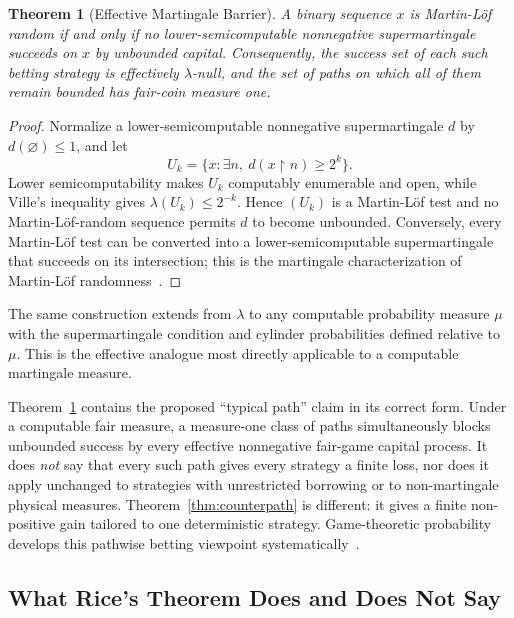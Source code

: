 \documentclass[aps,pra,reprint,superscriptaddress,amsmath,amssymb,floatfix]{revtex4-2}
\theoremstyle{plain}
\newtheorem{theorem}{Theorem}
\theoremstyle{definition}
\theoremstyle{remark}
\begin{document}
\begin{theorem}[Effective Martingale Barrier]
  \label{thm:effective}
  A binary sequence \(x\) is Martin-L\"of random if and only if no
  lower-semicomputable nonnegative supermartingale succeeds on \(x\) by
  unbounded capital. Consequently, the success set of each such betting
  strategy is effectively \(\lambda\)-null, and the set of paths on which all
  of them remain bounded has fair-coin measure one.
\end{theorem}

\begin{proof}
Normalize a lower-semicomputable nonnegative supermartingale \(d\) by
\(d(\varnothing)\leq1\), and let
\[
  U_k=\{x:\exists n,\ d(x{\upharpoonright}n)\geq2^k\}.
\]
Lower semicomputability makes \(U_k\) computably enumerable and open, while
Ville's inequality gives \(\lambda(U_k)\leq2^{-k}\). Hence
\((U_k)\) is a Martin-L\"of test and no Martin-L\"of-random sequence permits
\(d\) to become unbounded. Conversely, every Martin-L\"of test can be converted
into a lower-semicomputable supermartingale that succeeds on its intersection;
this is the martingale characterization of Martin-L\"of
randomness~\cite{calude:02,Nies2009}.
\end{proof}

The same construction extends from \(\lambda\) to any computable probability
measure \(\mu\) with the supermartingale condition and cylinder probabilities
defined relative to \(\mu\). This is the effective analogue most directly
applicable to a computable martingale measure.

Theorem~\ref{thm:effective} contains the proposed ``typical path'' claim in its
correct form. Under a computable fair measure, a measure-one class of paths
simultaneously blocks unbounded success by every effective nonnegative
fair-game capital process. It does \emph{not} say that every such path gives
every strategy a finite loss, nor does it apply unchanged to strategies with
unrestricted borrowing or to non-martingale physical measures.
Theorem~\ref{thm:counterpath} is different: it gives a finite non-positive gain
tailored to one deterministic strategy. Game-theoretic probability develops
this pathwise betting viewpoint systematically~\cite{ShaferVovk2001}.

\subsection{What Rice's Theorem Does and Does Not Say}
\end{document}
